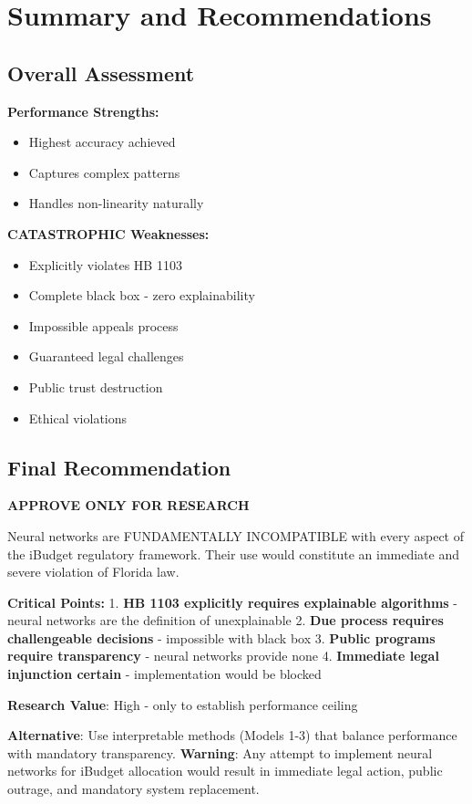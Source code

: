 \section{Summary and Recommendations}

\subsection{Overall Assessment}

\textbf{Performance Strengths:}
\begin{itemize}
    \item[\greencheck ] Highest accuracy achieved
    \item[\greencheck] Captures complex patterns
    \item[\greencheck] Handles non-linearity naturally
\end{itemize}
\textbf{CATASTROPHIC Weaknesses:}
\begin{itemize}
    \item[\redcross] Explicitly violates HB 1103
    \item[\redcross] Complete black box - zero explainability
    \item[\redcross] Impossible appeals process
    \item[\redcross] Guaranteed legal challenges
    \item[\redcross] Public trust destruction
    \item[\redcross] Ethical violations
\end{itemize}

\subsection{Final Recommendation}

\textbf{APPROVE ONLY FOR RESEARCH}

Neural networks are FUNDAMENTALLY INCOMPATIBLE with every aspect of the iBudget regulatory framework. Their use would constitute an immediate and severe violation of Florida law.

\textbf{Critical Points:}
1. \textbf{HB 1103 explicitly requires explainable algorithms} - neural networks are the definition of unexplainable
2. \textbf{Due process requires challengeable decisions} - impossible with black box
3. \textbf{Public programs require transparency} - neural networks provide none
4. \textbf{Immediate legal injunction certain} - implementation would be blocked

\textbf{Research Value}: High - only to establish performance ceiling

\textbf{Alternative}: Use interpretable methods (Models 1-3) that balance performance with mandatory transparency.
\textbf{Warning}: Any attempt to implement neural networks for iBudget allocation would result in immediate legal action, public outrage, and mandatory system replacement.
